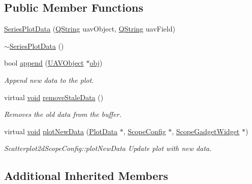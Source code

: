 \subsection*{Public Member Functions}
\begin{DoxyCompactItemize}
\item 
\hyperlink{group___scope_plugin_ga82d1767158aa15b3c4306bc74960692e}{Series\-Plot\-Data} (\hyperlink{group___u_a_v_objects_plugin_gab9d252f49c333c94a72f97ce3105a32d}{Q\-String} uav\-Object, \hyperlink{group___u_a_v_objects_plugin_gab9d252f49c333c94a72f97ce3105a32d}{Q\-String} uav\-Field)
\item 
\hyperlink{group___scope_plugin_gae281a484eece3ddc571d397e576bad97}{$\sim$\-Series\-Plot\-Data} ()
\item 
bool \hyperlink{group___scope_plugin_ga3f88889724489ec42f8bc0544a3f4474}{append} (\hyperlink{class_u_a_v_object}{U\-A\-V\-Object} $\ast$\hyperlink{glext_8h_a0c0d4701a6c89f4f7f0640715d27ab26}{obj})
\begin{DoxyCompactList}\small\item\em Append new data to the plot. \end{DoxyCompactList}\item 
virtual \hyperlink{group___u_a_v_objects_plugin_ga444cf2ff3f0ecbe028adce838d373f5c}{void} \hyperlink{group___scope_plugin_gad07a97346395d3ee7ee2d455a6d863d1}{remove\-Stale\-Data} ()
\begin{DoxyCompactList}\small\item\em Removes the old data from the buffer. \end{DoxyCompactList}\item 
virtual \hyperlink{group___u_a_v_objects_plugin_ga444cf2ff3f0ecbe028adce838d373f5c}{void} \hyperlink{group___scope_plugin_ga9a0a0e2cd48eeba6f77d3da8421729c4}{plot\-New\-Data} (\hyperlink{class_plot_data}{Plot\-Data} $\ast$, \hyperlink{class_scope_config}{Scope\-Config} $\ast$, \hyperlink{class_scope_gadget_widget}{Scope\-Gadget\-Widget} $\ast$)
\begin{DoxyCompactList}\small\item\em Scatterplot2d\-Scope\-Config\-::plot\-New\-Data Update plot with new data. \end{DoxyCompactList}\end{DoxyCompactItemize}
\subsection*{Additional Inherited Members}


